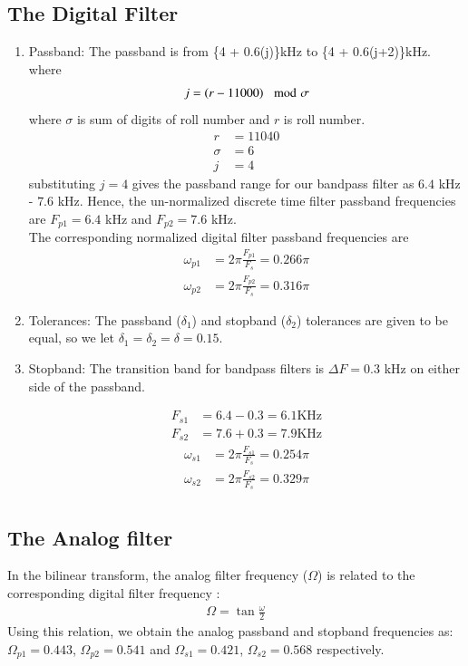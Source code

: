 \documentclass{article}
\begin{document}
\subsection{The Digital Filter}
\begin{enumerate}
\item {Passband:}
The passband is from \{4 + 0.6(j)\}kHz to \{4 + 0.6(j+2)\}kHz. \\
where 
\begin{align}
    j=\left(r-11000\right) \mod \sigma
\end{align}
where $\sigma$ is sum of digits of roll number and $r$ is roll number.\\
\begin{align}
    r&=11040\\
    \sigma  &= 6\\
    j&=4
\end{align}
 substituting $j =4$ gives the passband
range for our bandpass filter as $6.4$ kHz - $7.6$ kHz.  Hence, the un-normalized discrete time filter
passband frequencies are $F_{p1} = 6.4$ kHz
and $F_{p2} = 7.6$ kHz. \\
The corresponding normalized digital filter passband frequencies are
\begin{align}
    \omega_{p1} &= 2\pi\frac{F_{p1}}{F_s} = 0.266 \pi\\
    \omega_{p2} &= 2\pi\frac{F_{p2}}{F_s}  =0.316 \pi
\end{align}

\item {Tolerances:}  The passband ($\delta_1$) and stopband ($\delta_2$) tolerances are given to
be equal, so we let $\delta_1 = \delta_2 = \delta = 0.15$.

\item { Stopband:}  The {transition band} for bandpass filters is $\Delta F = 0.3$ kHz on either side of the passband.

\begin{align}
    F_{s1} &= 6.4-0.3 = 6.1 \text{KHz}\\
    F	_{s2} &= 7.6+0.3 = 7.9  \text{KHz}
\end{align}
\begin{align}
    \omega_{s1} &= 2\pi\frac{F_{s1}}{F_s} = 0.254\pi\\
     \omega_{s2} &= 2\pi\frac{F_{s2}}{F_s} = 0.329 \pi\\
\end{align}
\end{enumerate}
\subsection{The Analog filter}
In the bilinear transform, the analog filter frequency ($\Omega$) is related to the corresponding digital filter frequency\brak{\omega} :
\begin{align}
  \Omega = \tan \frac{\omega}{2}  
\end{align}
Using this relation, we obtain the analog passband and stopband frequencies as:
$\Omega_{p1} = 0.443$, $\Omega_{p2} = 0.541$ and $\Omega_{s1} = 0.421$, $\Omega_{s2} = 0.568$
respectively.
\end{document}
